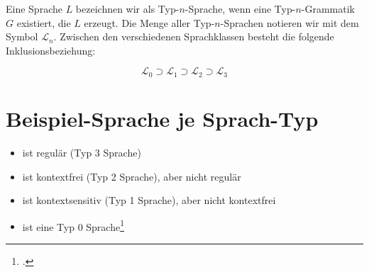 \documentclass{bschlangaul-theorie}
\begin{document}
\begin{center}
\end{center}

\noindent
Eine Sprache $L$ bezeichnen wir als Typ-$n$-Sprache, wenn eine
Typ-$n$-Grammatik $G$ existiert, die $L$ erzeugt. Die Menge aller
Typ-$n$-Sprachen notieren wir mit dem Symbol $\mathcal{L}_n$. Zwischen
den verschiedenen Sprachklassen besteht die folgende
Inklusionsbeziehung:

\begin{displaymath}
\mathcal{L}_0 \supset \mathcal{L}_1 \supset \mathcal{L}_2 \supset \mathcal{L}_3
\end{displaymath}

%

\section{Beispiel-Sprache je Sprach-Typ}

\begin{itemize}
\item {}
ist regulär (Typ 3 Sprache)

\item {}
ist kontextfrei (Typ 2 Sprache), aber nicht regulär

\item {}
ist kontextsensitiv (Typ 1 Sprache), aber nicht kontextfrei

\item {}
ist eine Typ 0 Sprache\footcite[Seite 15]{theo:fs:1}
\end{itemize}
\end{document}
